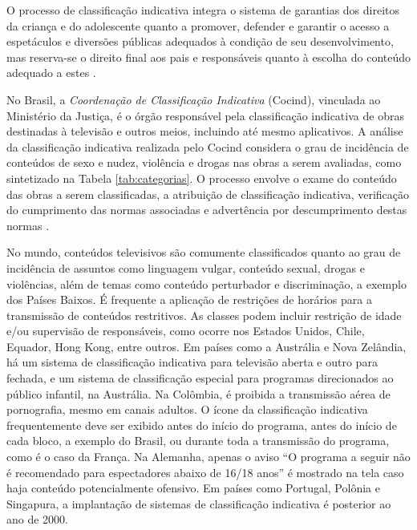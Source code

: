 
O processo de classificação indicativa integra o sistema de garantias dos direitos da criança e do adolescente quanto a promover, defender e garantir o acesso a espetáculos e diversões públicas adequados à condição de seu desenvolvimento, mas reserva-se o direito final aos pais e responsáveis quanto à escolha do conteúdo adequado a estes \cite{eca}.




No Brasil, a \emph{Coordenação de Classificação Indicativa} (Cocind), vinculada ao Ministério da Justiça, é o órgão responsável pela classificação indicativa de obras destinadas à televisão e outros meios, incluindo até mesmo aplicativos. A análise da classificação indicativa realizada pelo Cocind considera o grau de incidência de conteúdos de sexo e nudez, violência e drogas nas obras a serem avaliadas, como sintetizado na Tabela \ref{tab:categorias}. O processo envolve o exame do conteúdo das obras a serem classificadas, a atribuição de classificação indicativa, verificação do cumprimento das normas associadas e advertência por descumprimento destas normas \cite{portaria:ci}.

No mundo, conteúdos televisivos são comumente classificados quanto ao grau de incidência de assuntos como linguagem vulgar, conteúdo sexual, drogas e violências, além de temas como conteúdo perturbador e discriminação, a exemplo dos Países Baixos. É frequente a aplicação de restrições de horários para a transmissão de conteúdos restritivos. As classes podem incluir restrição de idade e/ou supervisão de responsáveis, como ocorre nos Estados Unidos, Chile, Equador, Hong Kong, entre outros. Em países como a Austrália e Nova Zelândia, há um sistema de classificação indicativa para televisão aberta e outro para fechada, e um sistema de classificação especial para programas direcionados ao público infantil, na Austrália. Na Colômbia, é proibida a transmissão aérea de pornografia, mesmo em canais adultos. O ícone da classificação indicativa frequentemente deve ser exibido antes do início do programa, antes do início de cada bloco, a exemplo do Brasil, ou durante toda a transmissão do programa, como é o caso da França.  Na Alemanha, apenas o aviso ``O programa a seguir não é recomendado para espectadores abaixo de 16/18 anos'' é mostrado na tela caso haja conteúdo potencialmente ofensivo. Em países como Portugal, Polônia e Singapura, a implantação de sistemas de classificação indicativa é posterior ao ano de 2000. 
